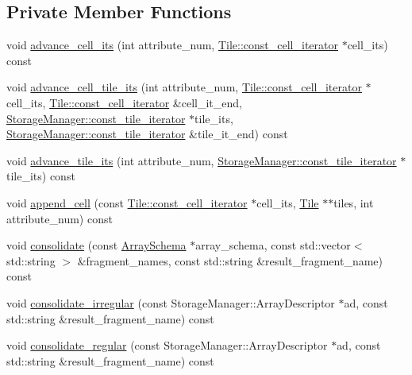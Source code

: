 \subsection*{Private Member Functions}
\begin{DoxyCompactItemize}
\item 
void \hyperlink{classConsolidator_a6f7c498dc3132f30422f5c434b380f96}{advance\+\_\+cell\+\_\+its} (int attribute\+\_\+num, \hyperlink{classTile_1_1const__cell__iterator}{Tile\+::const\+\_\+cell\+\_\+iterator} $\ast$cell\+\_\+its) const 
\item 
void \hyperlink{classConsolidator_a7bc7c4747bfafc3dd5d70f248a869e78}{advance\+\_\+cell\+\_\+tile\+\_\+its} (int attribute\+\_\+num, \hyperlink{classTile_1_1const__cell__iterator}{Tile\+::const\+\_\+cell\+\_\+iterator} $\ast$cell\+\_\+its, \hyperlink{classTile_1_1const__cell__iterator}{Tile\+::const\+\_\+cell\+\_\+iterator} \&cell\+\_\+it\+\_\+end, \hyperlink{classStorageManager_1_1const__tile__iterator}{Storage\+Manager\+::const\+\_\+tile\+\_\+iterator} $\ast$tile\+\_\+its, \hyperlink{classStorageManager_1_1const__tile__iterator}{Storage\+Manager\+::const\+\_\+tile\+\_\+iterator} \&tile\+\_\+it\+\_\+end) const 
\item 
void \hyperlink{classConsolidator_af95ef33a82fe6ada770bce3191192185}{advance\+\_\+tile\+\_\+its} (int attribute\+\_\+num, \hyperlink{classStorageManager_1_1const__tile__iterator}{Storage\+Manager\+::const\+\_\+tile\+\_\+iterator} $\ast$tile\+\_\+its) const 
\item 
void \hyperlink{classConsolidator_a1a8b7b11bbd01d50acba843cfc4884e9}{append\+\_\+cell} (const \hyperlink{classTile_1_1const__cell__iterator}{Tile\+::const\+\_\+cell\+\_\+iterator} $\ast$cell\+\_\+its, \hyperlink{classTile}{Tile} $\ast$$\ast$tiles, int attribute\+\_\+num) const 
\item 
void \hyperlink{classConsolidator_ab1d109b394bb64fe33a00a20805ec971}{consolidate} (const \hyperlink{classArraySchema}{Array\+Schema} $\ast$array\+\_\+schema, const std\+::vector$<$ std\+::string $>$ \&fragment\+\_\+names, const std\+::string \&result\+\_\+fragment\+\_\+name) const 
\item 
void \hyperlink{classConsolidator_a69d3e9df3658ab2f4254aa3dc0ec8108}{consolidate\+\_\+irregular} (const Storage\+Manager\+::\+Array\+Descriptor $\ast$ad, const std\+::string \&result\+\_\+fragment\+\_\+name) const 
\item 
void \hyperlink{classConsolidator_afd735586c28babe0aa28b179a86b11da}{consolidate\+\_\+regular} (const Storage\+Manager\+::\+Array\+Descriptor $\ast$ad, const std\+::string \&result\+\_\+fragment\+\_\+name) const 
$$
\end{DoxyCompactItemize}
